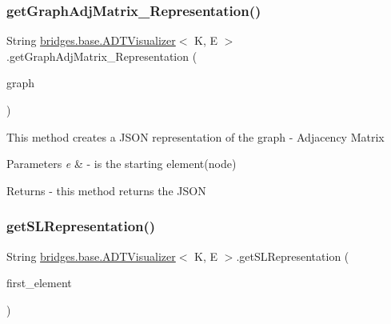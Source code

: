 \subsubsection{\texorpdfstring{get\+Graph\+Adj\+Matrix\+\_\+\+Representation()}{getGraphAdjMatrix\_Representation()}}
{\footnotesize\ttfamily String \hyperlink{classbridges_1_1base_1_1_a_d_t_visualizer}{bridges.\+base.\+A\+D\+T\+Visualizer}$<$ K, E $>$.get\+Graph\+Adj\+Matrix\+\_\+\+Representation (\begin{DoxyParamCaption}\item[{\hyperlink{classbridges_1_1base_1_1_graph_adj_matrix}{Graph\+Adj\+Matrix}$<$ K, E $>$}]{graph }\end{DoxyParamCaption})}

This method creates a J\+S\+ON representation of the graph -\/ Adjacency Matrix


\begin{DoxyParams}{Parameters}
{\em e} & -\/ is the starting element(node) \\
\hline
\end{DoxyParams}
\begin{DoxyReturn}{Returns}
-\/ this method returns the J\+S\+ON 
\end{DoxyReturn}
\hypertarget{classbridges_1_1base_1_1_a_d_t_visualizer_a8bfd44ca6eef7b19feb6061cb7e141ef}{}\label{classbridges_1_1base_1_1_a_d_t_visualizer_a8bfd44ca6eef7b19feb6061cb7e141ef} 
\subsubsection{\texorpdfstring{get\+S\+L\+Representation()}{getSLRepresentation()}}
{\footnotesize\ttfamily String \hyperlink{classbridges_1_1base_1_1_a_d_t_visualizer}{bridges.\+base.\+A\+D\+T\+Visualizer}$<$ K, E $>$.get\+S\+L\+Representation (\begin{DoxyParamCaption}\item[{\hyperlink{classbridges_1_1base_1_1_s_lelement}{S\+Lelement}$<$ E $>$}]{first\+\_\+element }\end{DoxyParamCaption})}

\hypertarget{classbridges_1_1base_1_1_a_d_t_visualizer_ae01d3d38d5c7c3ac239e86d6be46a50a}{}\label{classbridges_1_1base_1_1_a_d_t_visualizer_ae01d3d38d5c7c3ac239e86d6be46a50a} 
